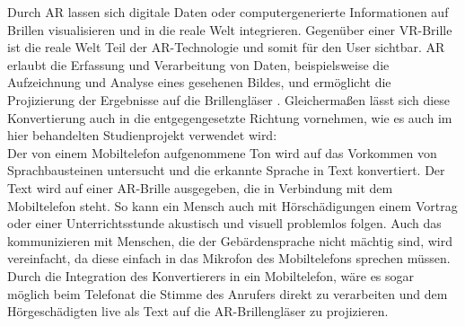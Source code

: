 Durch AR lassen sich digitale Daten oder computergenerierte Informationen auf Brillen visualisieren und in die reale Welt integrieren. Gegenüber einer VR-Brille ist die reale Welt Teil der AR-Technologie und somit für den User sichtbar. AR erlaubt die Erfassung und Verarbeitung von Daten, beispielsweise die Aufzeichnung und Analyse eines gesehenen Bildes, und ermöglicht die Projizierung der Ergebnisse auf die Brillengläser \cite{kipper_augmented_2012}. Gleichermaßen lässt sich diese Konvertierung auch in die entgegengesetzte Richtung vornehmen, wie es auch im hier behandelten Studienprojekt verwendet wird:\\ 
Der von einem Mobiltelefon aufgenommene Ton wird auf das Vorkommen von Sprachbausteinen untersucht und die erkannte Sprache in Text konvertiert. Der Text wird auf einer AR-Brille ausgegeben, die in Verbindung mit dem Mobiltelefon steht. So kann ein Mensch auch mit Hörschädigungen einem Vortrag oder einer Unterrichtsstunde akustisch und visuell problemlos folgen. Auch das kommunizieren mit Menschen, die der Gebärdensprache nicht mächtig sind, wird vereinfacht, da diese einfach in das Mikrofon des Mobiltelefons sprechen müssen. Durch die Integration des Konvertierers in ein Mobiltelefon, wäre es sogar möglich beim Telefonat die Stimme des Anrufers direkt zu verarbeiten und dem Hörgeschädigten live als Text auf die AR-Brillengläser zu projizieren.

